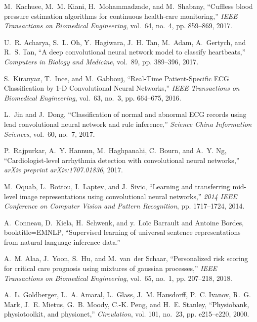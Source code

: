 \documentclass[10pt, conference, compsocconf]{IEEEtran}
\begin{document}
\begin{thebibliography}{10}
	M.~Kachuee, M.~M. Kiani, H.~Mohammadzade, and M.~Shabany, ``Cuffless blood
	pressure estimation algorithms for continuous health-care monitoring,''
	\emph{IEEE Transactions on Biomedical Engineering}, vol.~64, no.~4, pp.
	859--869, 2017.
	
	U.~R. Acharya, S.~L. Oh, Y.~Hagiwara, J.~H. Tan, M.~Adam, A.~Gertych, and R.~S.
	Tan, ``{A deep convolutional neural network model to classify heartbeats},''
	\emph{Computers in Biology and Medicine}, vol.~89, pp. 389--396, 2017.
	
	S.~Kiranyaz, T.~Ince, and M.~Gabbouj, ``{Real-Time Patient-Specific ECG
		Classification by 1-D Convolutional Neural Networks},'' \emph{IEEE
		Transactions on Biomedical Engineering}, vol.~63, no.~3, pp. 664--675, 2016.
	
	L.~Jin and J.~Dong, ``{Classification of normal and abnormal ECG records using
		lead convolutional neural network and rule inference},'' \emph{Science China
		Information Sciences}, vol.~60, no.~7, 2017.
	
	P.~Rajpurkar, A.~Y. Hannun, M.~Haghpanahi, C.~Bourn, and A.~Y. Ng,
	``Cardiologist-level arrhythmia detection with convolutional neural
	networks,'' \emph{arXiv preprint arXiv:1707.01836}, 2017.
	
	M.~Oquab, L.~Bottou, I.~Laptev, and J.~Sivic, ``Learning and transferring
	mid-level image representations using convolutional neural networks,''
	\emph{2014 IEEE Conference on Computer Vision and Pattern Recognition}, pp.
	1717--1724, 2014.
	
	A.~Conneau, D.~Kiela, H.~Schwenk, and y.~Lo{\"{i}c Barrault and Antoine
		Bordes}, booktitle={EMNLP}, ``Supervised learning of universal sentence
	representations from natural language inference data.''
	
	A.~M. Alaa, J.~Yoon, S.~Hu, and M.~van~der Schaar, ``Personalized risk scoring
	for critical care prognosis using mixtures of gaussian processes,''
	\emph{IEEE Transactions on Biomedical Engineering}, vol.~65, no.~1, pp.
	207--218, 2018.
	
	A.~L. Goldberger, L.~A. Amaral, L.~Glass, J.~M. Hausdorff, P.~C. Ivanov, R.~G.
	Mark, J.~E. Mietus, G.~B. Moody, C.-K. Peng, and H.~E. Stanley, ``Physiobank,
	physiotoolkit, and physionet,'' \emph{Circulation}, vol. 101, no.~23, pp.
	e215--e220, 2000.
	

\end{thebibliography}
\end{document}
